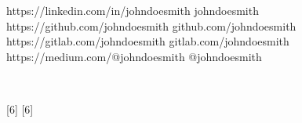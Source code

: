 {{\begin{icontable}[1.6]{1.7em}{0.4em}
            \cvMailWithIcon{\mymail}
            
            \cvaddress{\myaddress}
		\end{icontable}
    
    		\begin{icontable}{1.5em}{1em}
    		    \social{\faLinkedin}
    				{https://linkedin.com/in/johndoesmith}
    				{johndoesmith}
    		    \social{\faGithubSquare}
    				{https://github.com/johndoesmith}
    				{github.com/johndoesmith}
    			\social{\faGitlab}
    				{https://gitlab.com/johndoesmith}
    				{gitlab.com/johndoesmith}
    			\social{\faMedium}
    			    {https://medium.com/@johndoesmith}
    			    {@johndoesmith}
    		\end{icontable}
    		
        	    {
        	        \hspace{0em}  ~ 
        	    } \par
        	    
    	
			
        
        	
        
        \null\vfill
        
        \sidesectioncentered{\raise \large \raisebox{0.5mm}{Legend}}
            \begin{sidebannerminipage}
                \centering
                \small
                \par
        	\end{sidebannerminipage}
        
        
    } %
}
